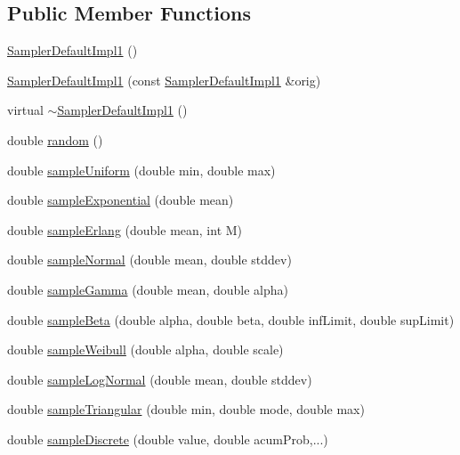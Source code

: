 \subsection*{Public Member Functions}
\begin{DoxyCompactItemize}
\item 
\hyperlink{class_sampler_default_impl1_afc174d33e8a21000aae83f1cd7b20485}{Sampler\+Default\+Impl1} ()
\item 
\hyperlink{class_sampler_default_impl1_a0d9909ee49e555874300fe4e625716d2}{Sampler\+Default\+Impl1} (const \hyperlink{class_sampler_default_impl1}{Sampler\+Default\+Impl1} \&orig)
\item 
virtual \hyperlink{class_sampler_default_impl1_a2ce9183218d642a4806c314c7eec2b71}{$\sim$\+Sampler\+Default\+Impl1} ()
\item 
double \hyperlink{class_sampler_default_impl1_a035aa0704204ca8b4633be2fa013b31a}{random} ()
\item 
double \hyperlink{class_sampler_default_impl1_a83a193b590f3c4ac577a7afb25c781b5}{sample\+Uniform} (double min, double max)
\item 
double \hyperlink{class_sampler_default_impl1_ac467ff4dcc21a47fdc0988d5f0a097e7}{sample\+Exponential} (double mean)
\item 
double \hyperlink{class_sampler_default_impl1_a8a6d2d9f410d5836af44bfe270544ff4}{sample\+Erlang} (double mean, int M)
\item 
double \hyperlink{class_sampler_default_impl1_a08b9a57ef18e04af6ae84fc4bf0811fb}{sample\+Normal} (double mean, double stddev)
\item 
double \hyperlink{class_sampler_default_impl1_a5d3511009bd1ac4aa69240437830eefc}{sample\+Gamma} (double mean, double alpha)
\item 
double \hyperlink{class_sampler_default_impl1_a43a1ac8a435a0d98966ae18b17a04edb}{sample\+Beta} (double alpha, double beta, double inf\+Limit, double sup\+Limit)
\item 
double \hyperlink{class_sampler_default_impl1_a175f89bbf0ec4d52d89b44d390ce5980}{sample\+Weibull} (double alpha, double scale)
\item 
double \hyperlink{class_sampler_default_impl1_a53172f08f1963a3b3ea9b70f79131a7c}{sample\+Log\+Normal} (double mean, double stddev)
\item 
double \hyperlink{class_sampler_default_impl1_a08bad7450164364c754b03bf7fa87abc}{sample\+Triangular} (double min, double mode, double max)
\item 
double \hyperlink{class_sampler_default_impl1_afbdc37c5c419c9e684042cc497c4143a}{sample\+Discrete} (double value, double acum\+Prob,...)

\end{DoxyCompactItemize}

